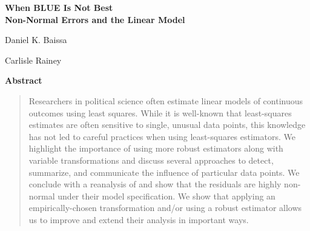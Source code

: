 \documentclass[12pt]{article}
\begin{document}
\begin{center}
{\LARGE \textbf{When BLUE Is Not Best}}\\\vspace{2mm}
{ \textbf{Non-Normal Errors and the Linear Model}}\\\vspace{2mm}


\vspace{10mm}

Daniel K. Baissa

\vspace{3mm}

Carlisle Rainey
\end{center}

\vspace{10mm}

{\centerline{\textbf{Abstract}}}
\begin{quote}\noindent
Researchers in political science often estimate linear models of continuous outcomes using least squares. 
While it is well-known that least-squares estimates are often sensitive to single, unusual data points, this knowledge has not led to careful practices when using least-squares estimators. 
We highlight the importance of using more robust estimators along with variable transformations and discuss several approaches to detect, summarize, and communicate the influence of particular data points. 
We conclude with a reanalysis of \cite{ClarkGolder2006} and show that the residuals are highly non-normal under their model specification. 
We show that applying an empirically-chosen transformation and/or using a robust estimator allows us to improve and extend their analysis in important ways.
 \end{quote}

\end{document}
